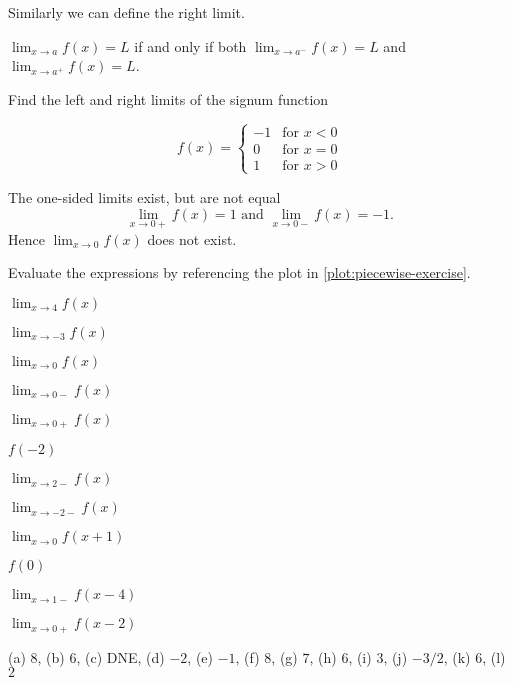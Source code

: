 \documentclass[../calc1-main.tex]{subfiles}
\begin{document}
  Similarly we can define the right limit.

  \begin{theorem}
    $\lim_{x \to a} f(x) = L$ if and only if both $\lim_{x \to a^{-}} f(x) =L$ and $\lim_{x \to a^{+}} f(x) = L$.
  \end{theorem}

  \begin{example}
    Find the left and right limits of the signum function

    \begin{minipage}[c]{0.5\textwidth}
      \[
        f(x) =
        \begin{cases}
          -1 & \text{for $x<0$}\\ 0 & \text{for $x=0$}\\ 1 & \text{for $x>0$}
        \end{cases}
      \]
    \end{minipage}
    \begin{minipage}[c]{0.2\textwidth}
      \begin{figure}[H]
        \centering
        
      \end{figure}
    \end{minipage}
  \end{example}
  \begin{solution}
    The one-sided limits exist, but are not equal
    \[
      \lim_{x\to0+}f(x) = 1 \text{ and } \lim_{x\to0-}f(x) = -1.
    \]
    Hence $\lim_{x\to 0} f(x)$ does not exist.
  \end{solution}


\begin{example} Evaluate the expressions by referencing the plot in \autoref{plot:piecewise-exercise}.
\begin{figure}[H]
  \centering
  
  \caption{\label{plot:piecewise-exercise}}
\end{figure}

\begin{enumerate}[a)]
\begin{multicols}{3}
\item $\lim_{x\to 4} f(x)$
\item $\lim_{x\to -3} f(x)$
\item $\lim_{x\to 0} f(x)$
\item $\lim_{x\to 0-} f(x)$
\item $\lim_{x\to 0+} f(x)$
\item $f(-2)$
\item $\lim_{x\to 2-} f(x)$
\item $\lim_{x\to -2-} f(x)$
\item $\lim_{x\to 0} f(x+1)$
\item $f(0)$
\item $\lim_{x\to 1-} f(x-4)$
\item $\lim_{x\to 0+} f(x-2)$
\end{multicols}
\end{enumerate}

(a) $8$, (b) $6$, (c) DNE,
(d) $-2$, (e) $-1$, (f) $8$,
(g) $7$, (h) $6$, (i) $3$,
(j) $-3/2$, (k) $6$, (l) $2$
\end{example}
\end{document}
